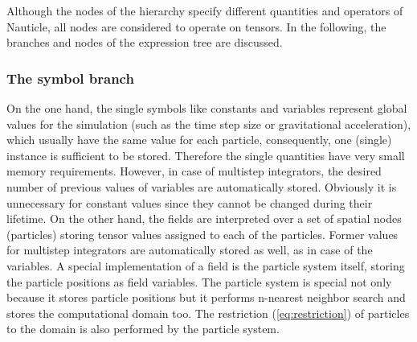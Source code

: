 \documentclass[a4paper,12pt,openany]{book}
\newcommand{\equref}[1]{(\ref{#1})}
\theoremstyle{break}
\begin{document}
Although the nodes of the hierarchy specify different quantities and operators of Nauticle, all nodes are considered to operate on tensors. In the following, the branches and nodes of the expression tree are discussed.

\subsubsection{The symbol branch}
On the one hand, the single symbols like constants and variables represent global values for the simulation (such as the time step size or gravitational acceleration), which usually have the same value for each particle, consequently, one (single) instance is sufficient to be stored. Therefore the single quantities have very small memory requirements. However, in case of multistep integrators, the desired number of previous values of variables are automatically stored. Obviously it is unnecessary for constant values since they cannot be changed during their lifetime. On the other hand, the fields are interpreted over a set of spatial nodes (particles) storing tensor values assigned to each of the particles. Former values for multistep integrators are automatically stored as well, as in case of the variables. A special implementation of a field is the particle system itself, storing the particle positions as field variables. The particle system is special not only because it stores particle positions but it performs n-nearest neighbor search and stores the computational domain too. The restriction \equref{eq:restriction} of particles to the domain is also performed by the particle system.
\end{document}
